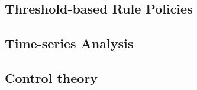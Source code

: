 

\subsection{Threshold-based Rule Policies}



\subsection{Time-series Analysis}



\subsection{Control theory}


